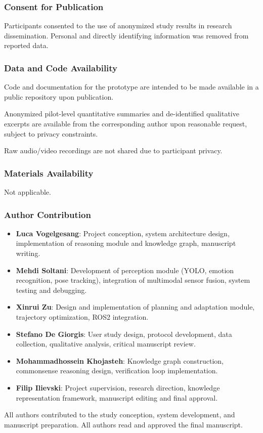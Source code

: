 \documentclass[pdflatex,sn-basic,Numbered,iicol,twocolumn]{sn-jnl}%
\begin{document}
\subsubsection*{Consent for Publication} Participants consented to the use of anonymized study results in research dissemination. Personal and directly identifying information was removed from reported data.

\subsubsection*{Data and Code Availability}
Code and documentation for the prototype are intended to be made available in a public repository upon publication.

Anonymized pilot-level quantitative summaries and de-identified qualitative excerpts are available from the corresponding author upon reasonable request, subject to privacy constraints.

Raw audio/video recordings are not shared due to participant privacy.

\subsubsection*{Materials Availability} Not applicable.

\subsubsection*{Author Contribution}

\begin{itemize}
\item \textbf{Luca Vogelgesang}: Project conception, system architecture design, implementation of reasoning module and knowledge graph, manuscript writing.
\item \textbf{Mehdi Soltani}: Development of perception module (YOLO, emotion recognition, pose tracking), integration of multimodal sensor fusion, system testing and debugging.
\item \textbf{Xinrui Zu}: Design and implementation of planning and adaptation module, trajectory optimization, ROS2 integration.
\item \textbf{Stefano De Giorgis}: User study design, protocol development, data collection, qualitative analysis, critical manuscript review.
\item \textbf{Mohammadhossein Khojasteh}: Knowledge graph construction, commonsense reasoning design, verification loop implementation.
\item \textbf{Filip Ilievski}: Project supervision, research direction, knowledge representation framework, manuscript editing and final approval.
\end{itemize}

All authors contributed to the study conception, system development, and manuscript preparation. All authors read and approved the final manuscript.


\end{document}

